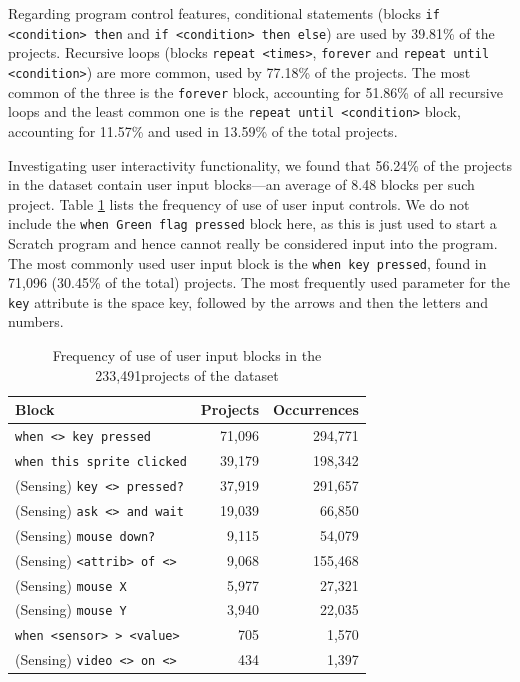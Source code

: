 \documentclass{sig-alternate}
\newcommand{\nScriptPrograms}{233,491}
\begin{document}
Regarding program control features, conditional statements (blocks \texttt{if <condition> then} and \texttt{if <condition> then else}) are used by 39.81\% of the projects. Recursive loops (blocks \texttt{repeat <times>}, \texttt{forever} and \texttt{repeat until <condition>}) are more common, used by 77.18\% of the projects. The most common of the three is the \texttt{forever} block, accounting for 51.86\% of all recursive loops and the least common one is the \texttt{repeat until <condition>} block, accounting for 11.57\% and used in 13.59\% of the total projects.
	
Investigating user interactivity functionality, we found that 56.24\% of the projects in the dataset contain user input blocks---an average of 8.48 blocks per such project. Table \ref{tbl-userinput} lists the frequency of use of user input controls. We do not include the \texttt{when Green flag pressed} block here, as this is just used to start a Scratch program and hence cannot really be considered input into the program. The most commonly used user input block is the \texttt{when key pressed}, found in 71,096 (30.45\% of the total) projects. The most frequently used parameter for the \texttt{key} attribute is the space key, followed by the arrows and then the letters and numbers.

\begin{table}
	\centering
	\begin{tabular}{lrr}
		\hline
		\textbf{Block}&\textbf{Projects}&\textbf{Occurrences}\\
		\hline
	\texttt{when <> key pressed}&71,096&294,771\\
	\texttt{when this sprite clicked}&39,179&198,342\\
	(Sensing) \texttt{key <> pressed?}&37,919&291,657\\
	(Sensing) \texttt{ask <> and wait}&19,039&66,850\\
	(Sensing) \texttt{mouse down?}&9,115&54,079\\
	(Sensing) \texttt{<attrib> of <>}&9,068&155,468\\
	(Sensing) \texttt{mouse X}&5,977&27,321\\
	(Sensing) \texttt{mouse Y}&3,940&22,035\\
	\texttt{when <sensor> > <value>}&705&1,570\\
	(Sensing) \texttt{video <> on <>}&434&1,397\\
		\hline
	\end{tabular}
	\caption{Frequency of use of user input blocks in the \nScriptPrograms projects of the dataset}
	\label{tbl-userinput}
\end{table}
\end{document}
